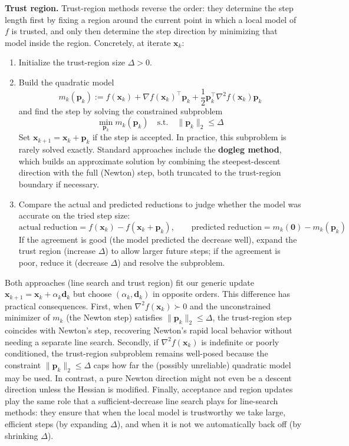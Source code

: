 \textbf{Trust region.}
Trust-region methods reverse the order: they determine the step length first by fixing a region around the current point in which a local model of $f$ is trusted, and only then determine the step direction by minimizing that model inside the region. Concretely, at iterate $\mathbf{x}_k$:
\begin{enumerate}
\item Initialize the trust-region size $\Delta>0$.
\item Build the quadratic model
\begin{equation}
    m_k(\mathbf{p}_k)
    := f(\mathbf{x}_k)         
    + \nabla f(\mathbf{x}_k)^{\top}\mathbf{p}_k         
    + \frac{1}{2}\mathbf{p}_k^{\top}\nabla^{2} f(\mathbf{x}_k)\mathbf{p}_k
\end{equation}
and find the step by solving the constrained subproblem
\begin{equation}
    \min_{\mathbf{p}_k} m_k(\mathbf{p}_k)
    \quad\text{s.t.}\quad \|\mathbf{p}_k\|_2 \le \Delta
\end{equation}
Set $\mathbf{x}_{k+1}=\mathbf{x}_k+\mathbf{p}_k$ if the step is accepted. In practice, this subproblem is rarely solved exactly. Standard approaches include the \textbf{dogleg method}, which builds an approximate solution by combining the steepest-descent direction with the full (Newton) step, both truncated to the trust-region boundary if necessary.
\item Compare the actual and predicted reductions to judge whether the model was accurate on the tried step size:
\begin{equation}
    \text{actual reduction} = f(\mathbf{x}_k)-f(\mathbf{x}_k+\mathbf{p}_k),\qquad
    \text{predicted reduction} = m_k(\mathbf{0})-m_k(\mathbf{p}_k)
\end{equation}
If the agreement is good (the model predicted the decrease well), expand the trust region (increase $\Delta$) to allow larger future steps; if the agreement is poor, reduce it (decrease $\Delta$) and resolve the subproblem.
\end{enumerate}

Both approaches (line search and trust region) fit our generic update $\mathbf{x}_{k+1}=\mathbf{x}_k+\alpha_k\mathbf{d}_k$ but choose $(\alpha_k,\mathbf{d}_k)$ in opposite orders. This difference has practical consequences. First, when $\nabla^{2} f(\mathbf{x}_k)\succ0$ and the unconstrained minimizer of $m_k$ (the Newton step) satisfies $\|\mathbf{p}_k\|_2\le\Delta$, the trust-region step coincides with Newton's step, recovering Newton's rapid local behavior without needing a separate line search. Secondly, if $\nabla^{2} f(\mathbf{x}_k)$ is indefinite or poorly conditioned, the trust-region subproblem remains well-posed because the constraint $\|\mathbf{p}_k\|_2\le\Delta$ caps how far the (possibly unreliable) quadratic model may be used. In contrast, a pure Newton direction might not even be a descent direction unless the Hessian is modified. Finally, acceptance and region updates play the same role that a sufficient-decrease line search plays for line-search methods: they ensure that when the local model is trustworthy we take large, efficient steps (by expanding $\Delta$), and when it is not we automatically back off (by shrinking $\Delta$).


